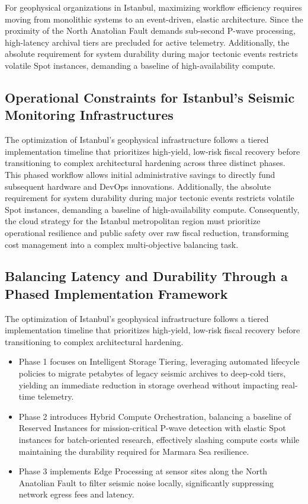 \documentclass[data,article,accept,pdftex,moreauthors]{Definitions/mdpi}
\begin{document}
For geophysical organizations in Istanbul, maximizing workflow efficiency requires moving from monolithic systems to an event-driven, elastic architecture. Since the proximity of the North Anatolian Fault demands sub-second P-wave processing, high-latency archival tiers are precluded for active telemetry. Additionally, the absolute requirement for system durability during major tectonic events restricts volatile Spot instances, demanding a baseline of high-availability compute.

\subsection{Operational Constraints for Istanbul's Seismic Monitoring Infrastructures}
The optimization of Istanbul's geophysical infrastructure follows a tiered implementation timeline that prioritizes high-yield, low-risk fiscal recovery before transitioning to complex architectural hardening across three distinct phases. This phased workflow allows initial administrative savings to directly fund subsequent hardware and DevOps innovations. Additionally, the absolute requirement for system durability during major tectonic events restricts volatile Spot instances, demanding a baseline of high-availability compute. Consequently, the cloud strategy for the Istanbul metropolitan region must prioritize operational resilience and public safety over raw fiscal reduction, transforming cost management into a complex multi-objective balancing task.

\subsection{Balancing Latency and Durability Through a Phased Implementation Framework}

The optimization of Istanbul's geophysical infrastructure follows a tiered implementation timeline that prioritizes high-yield, low-risk fiscal recovery before transitioning to complex architectural hardening.
\begin{itemize}
\item Phase 1 focuses on Intelligent Storage Tiering, leveraging automated lifecycle policies to migrate petabytes of legacy seismic archives to deep-cold tiers, yielding an immediate reduction in storage overhead without impacting real-time telemetry.
\item Phase 2 introduces Hybrid Compute Orchestration, balancing a baseline of Reserved Instances for mission-critical P-wave detection with elastic Spot instances for batch-oriented research, effectively slashing compute costs while maintaining the durability required for Marmara Sea resilience.
\item Phase 3 implements Edge Processing at sensor sites along the North Anatolian Fault to filter seismic noise locally, significantly suppressing network egress fees and latency.
\end{itemize}
\end{document}
